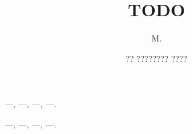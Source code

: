 \documentclass[
  12pt,             %
  french,           %
  greyCover,        %
  fancyChapter,     %
  fancyPart,        %
]{these-LUNAM_mod}
\title{TODO}
\author{M.}{Adrien}{Bougouin}
\date{?? ???????? ????}
\begin{document}
  \begin{resume}%
  \end{resume}

  \begin{motscles}
     ---, ---, ---, ---.
  \end{motscles}

  \begin{abstract}%
  \end{abstract}

  \begin{keywords}
     ---, ---, ---, ---.
  \end{keywords}

  \maketitle



  \tableofcontents

  
  
  
  

  \backmatter

  \listoftables
  \listoffigures

  
  
\end{document}

